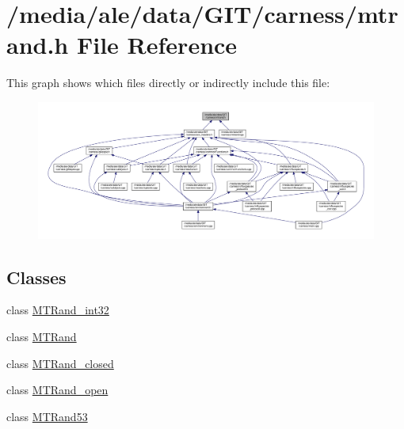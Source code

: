 \hypertarget{a00041}{\section{/media/ale/data/\-G\-I\-T/carness/mtrand.h File Reference}
\label{a00041}
}
This graph shows which files directly or indirectly include this file\-:\nopagebreak
\begin{figure}[H]
\begin{center}
\leavevmode
\includegraphics[width=350pt]{a00075}
\end{center}
\end{figure}
\subsection*{Classes}
\begin{DoxyCompactItemize}
\item 
class \hyperlink{a00019}{M\-T\-Rand\-\_\-int32}
\item 
class \hyperlink{a00016}{M\-T\-Rand}
\item 
class \hyperlink{a00018}{M\-T\-Rand\-\_\-closed}
\item 
class \hyperlink{a00020}{M\-T\-Rand\-\_\-open}
\item 
class \hyperlink{a00017}{M\-T\-Rand53}
\end{DoxyCompactItemize}

